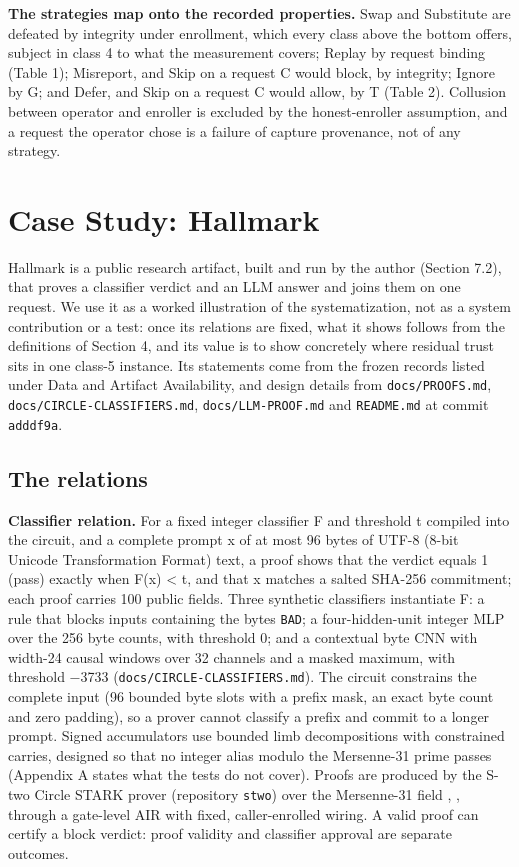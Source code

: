 \documentclass[11pt]{article}
\begin{document}
\textbf{The strategies map onto the recorded properties.} Swap and Substitute are defeated by integrity under enrollment, which every class above the bottom offers, subject in class 4 to what the measurement covers; Replay by request binding (Table 1); Misreport, and Skip on a request C would block, by integrity; Ignore by G; and Defer, and Skip on a request C would allow, by T (Table 2). Collusion between operator and enroller is excluded by the honest-enroller assumption, and a request the operator chose is a failure of capture provenance, not of any strategy.

\section{Case Study: Hallmark}

Hallmark is a public research artifact, built and run by the author (Section 7.2), that proves a classifier verdict and an LLM answer and joins them on one request. We use it as a worked illustration of the systematization, not as a system contribution or a test: once its relations are fixed, what it shows follows from the definitions of Section 4, and its value is to show concretely where residual trust sits in one class-5 instance. Its statements come from the frozen records listed under Data and Artifact Availability, and design details from \texttt{docs/\allowbreak{}PROOFS.\allowbreak{}md}, \texttt{docs/\allowbreak{}CIRCLE-\allowbreak{}CLASSIFIERS.\allowbreak{}md}, \texttt{docs/\allowbreak{}LLM-\allowbreak{}PROOF.\allowbreak{}md} and \texttt{README.\allowbreak{}md} at commit \texttt{adddf9a}.

\subsection{The relations}

\textbf{Classifier relation.} For a fixed integer classifier F and threshold t compiled into the circuit, and a complete prompt x of at most 96 bytes of UTF-8 (8-bit Unicode Transformation Format) text, a proof shows that the verdict equals 1 (pass) exactly when F(x) < t, and that x matches a salted SHA-256 commitment; each proof carries 100 public fields. Three synthetic classifiers instantiate F: a rule that blocks inputs containing the bytes \texttt{BAD}; a four-hidden-unit integer MLP over the 256 byte counts, with threshold 0; and a contextual byte CNN with width-24 causal windows over 32 channels and a masked maximum, with threshold −3733 (\texttt{docs/\allowbreak{}CIRCLE-\allowbreak{}CLASSIFIERS.\allowbreak{}md}). The circuit constrains the complete input (96 bounded byte slots with a prefix mask, an exact byte count and zero padding), so a prover cannot classify a prefix and commit to a longer prompt. Signed accumulators use bounded limb decompositions with constrained carries, designed so that no integer alias modulo the Mersenne-31 prime passes (Appendix A states what the tests do not cover). Proofs are produced by the S-two Circle STARK prover (repository \texttt{stwo}) over the Mersenne-31 field \cite{A27}, \cite{A28}, through a gate-level AIR with fixed, caller-enrolled wiring. A valid proof can certify a block verdict: proof validity and classifier approval are separate outcomes.
\end{document}
